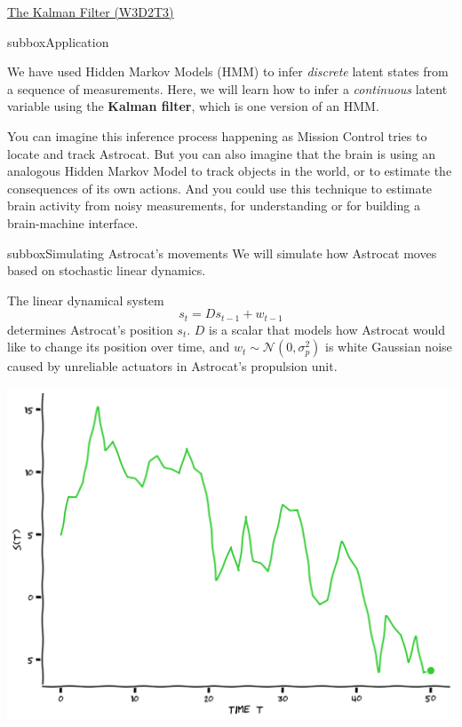 \begin{textbox}{\href{http://instructor.compneuro.neuromatch.io/tutorials/W3D2_HiddenDynamics/instructor/W3D2_Tutorial3.html}{The Kalman Filter (W3D2T3)}   }

\begin{subbox}{subbox}{Application}
\scriptsize

We have used Hidden Markov Models (HMM) to infer \textit{discrete} latent states from a sequence of measurements. Here, we will learn how to infer a \textit{continuous} latent variable using the \textbf{Kalman filter}, which is one version of an HMM.

You can imagine this inference process happening as Mission Control tries to locate and track Astrocat. But you can also imagine that the brain is using an analogous Hidden Markov Model to track objects in the world, or to estimate the consequences of its own actions. And you could use this technique to estimate brain activity from noisy measurements, for understanding or for building a brain-machine interface.

\end{subbox}
\begin{subbox}{subbox}{Simulating Astrocat's movements}
\scriptsize
We will simulate how Astrocat moves based on stochastic linear dynamics.

The linear dynamical system 
$$ s_t = Ds_{t-1} + w_{t-1}$$
determines Astrocat's position $s_t$. $D$ is a scalar that models how Astrocat would like to change its position over time, and $w_t \sim \mathcal{N}(0, \sigma_p^2)$ is white Gaussian noise caused by unreliable actuators in Astrocat's propulsion unit. 

\begin{center}
    
\includegraphics[scale=0.2]{Figures/HD/HD_Figure6.png}
\end{center}


\end{subbox}
\end{textbox}
